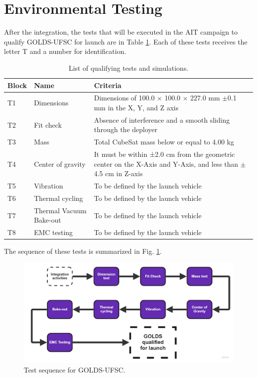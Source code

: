 \section{Environmental Testing}

After the integration, the tests that will be executed in the AIT campaign to qualify GOLDS-UFSC for launch are in Table \ref{table_test}. Each of these tests receives the letter T and a number for identification. %

\begin{table}[!htb]
    \centering
    \begin{tabular}{lll}
        \toprule[1.5pt]
    	\textbf{Block} & \textbf{Name} & \textbf{Criteria} \\
    	\midrule
    	T1    & Dimensions                  & \parbox[t]{8cm}{Dimensions of 100.0 $\times$ 100.0 $\times$ 227.0 mm $\pm$0.1 mm in the X, Y, and Z axis} \\
        T2    & Fit check                   & \parbox[t]{8cm}{Absence of interference and a smooth sliding through the deployer} \\
    	T3    & Mass                        & Total CubeSat mass below or equal to 4.00 kg \\
    	T4    & Center of gravity           & \parbox[t]{8cm}{It must be within ±2.0 cm from the geometric center on the X-Axis and Y-Axis, and less than $\pm$4.5 cm in Z-axis} \\
        T5    & Vibration                   & To be defined by the launch vehicle \\
        T6    & Thermal cycling             & To be defined by the launch vehicle \\
        T7    & Thermal Vacuum Bake-out     & To be defined by the launch vehicle \\
        T8    & EMC testing                 & To be defined by the launch vehicle \\
        \bottomrule[1.5pt]
	\end{tabular}
    \caption{\label{table_test}List of qualifying tests and simulations.}
\end{table}

The sequence of these tests is summarized in Fig. \ref{fig:testesequency}.

\begin{figure}[!htb]
    \centering
    \includegraphics[scale=0.3]{figures/tests_chart.pdf}
    \caption{Test sequence for GOLDS-UFSC.}
    \label{fig:testesequency}
\end{figure}


